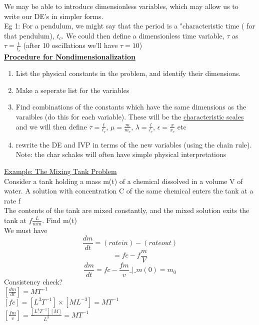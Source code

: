 \documentclass[12pt]{article}
\newcommand{\myt}[1]{\textbf{\underline{#1}}}
\begin{document}
	We may be able to introduce dimensionless variables, which may allow us to write our DE's in simpler forms.\\
	Eg 1: For a pendulum, we might say that the period is a "characteristic time ( for that pendulum), $t_c$. We could then define a dimensionless time variable, $\tau$ as $\tau = \frac{t}{t_c}$ (after 10 oscillations we'll have $\tau = 10$)\\
	
	\myt{Procedure for Nondimensionalization}\\
	\begin{enumerate}
		\item List the physical constants in the problem, and identify their dimensions.
		\item Make a seperate list for the variables
		\item Find combinations of the constants which have the same dimensions as the varaibles (do this for each variable). These will be the \underline{characteristic scales} and we will then define $\tau = \frac{t}{t_c}$, $\mu = \frac{m}{m_c}$, $\lambda = \frac{l}{l_c}$, $\epsilon = \frac{x}{x_c}$ etc
		\item rewrite the DE and IVP in terms of the new variables (using the chain rule). Note: the char schales will often have simple physical interpretations
	\end{enumerate}
	
	\underline{Example: The Mixing Tank Problem}\\
	Consider a tank holding a mass m(t) of a chemical dissolved in a volume V of water. A solution with concentration C of the same chemical enters the tank at a rate f\\
	
	The contents of the tank are mixed constantly, and the mixed solution exits the tank at $f \frac{L}{min}$. Find m(t)\\
	
	We must have 
	$$\frac{dm}{dt} = (rate in) - (rate out)$$
	$$= fc - f\frac{m}{V}$$
	$$\frac{dm}{dt} = fc - \frac{fm}{v} \_|\_ m(0) = m_0$$
	Consistency check?\\
	$[\frac{dm}{dt}] = MT^{-1}$\\
	$[fc] = [L^3T^{-1}] \times [ML^{-3}] = MT^{-1}$\\
	$[\frac{fm}{v}] = \frac{[L^4T^{-1}][M]}{L^3} = MT^{-1}$\\
	
\end{document}
